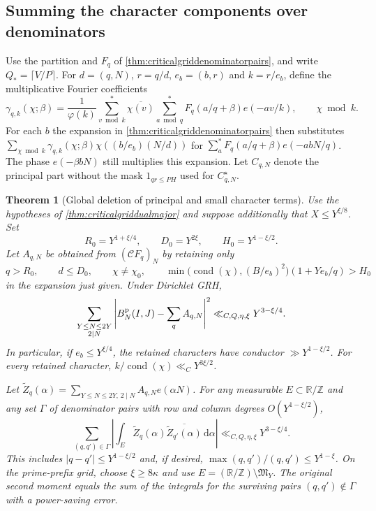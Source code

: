 \documentclass[11pt,a4paper]{article}
\numberwithin{equation}{section}
\newtheorem{theorem}{Theorem}[section]
\newcommand{\ud}{\mathrm d}
\begin{document}
\clearpage
\subsection{Summing the character components over denominators}

Use the partition and $F_q$ of
\cref{thm:criticalgriddenominatorpairs}, and write
$Q_*=\lceil V/P\rceil$. For $d=(q,N)$, $r=q/d$,
$e_b=(b,r)$ and $k=r/e_b$, define the multiplicative
Fourier coefficients
\[
 \gamma_{q,k}(\chi;\beta)=
 \frac1{\varphi(k)}
 \sum_{v\bmod k}^{*}\overline{\chi(v)}
 \sum_{a\bmod q}^{*}F_q(a/q+\beta)e(-av/k),
            \qquad \chi\bmod k.
\]
For each $b$ the expansion in \cref{thm:criticalgriddenominatorpairs}
then substitutes
$\sum_{\chi\bmod k}\gamma_{q,k}(\chi;\beta)\chi((b/e_b)(N/d))$
for $\sum_a^*F_q(a/q+\beta)e(-abN/q)$. The phase
$e(-\beta bN)$ still multiplies this expansion. Let
$C_{q,N}$ denote the principal part without the mask
$1_{qr\le PH}$ used for $C_{q,N}^{\star}$.

\begin{theorem}[Global deletion of principal and small character terms]
\label{thm:criticalgridglobalcharacters}
Use the hypotheses of \cref{thm:criticalgriddualmajor} and
suppose additionally that $X\le Y^{\xi/8}$. Set
\[
 R_0=Y^{1+\xi/4},\qquad D_0=Y^{2\xi},\qquad H_0=Y^{1-\xi/2}.
\]
Let $A_{q,N}$ be obtained from $(\mathcal C F_q)_N$ by
retaining only
\begin{equation}
 q>R_0,\qquad d\le D_0,\qquad \chi\ne\chi_0,\qquad
 \min\bigl(\operatorname{cond}(\chi),(B/e_b)^2\bigr)
                      (1+Y e_b/q)>H_0
 \label{eq:criticalgridglobalcut}
\end{equation}
in the expansion just given. Under Dirichlet GRH,
\begin{equation}
  \sum_{\substack{Y\le N\le2Y\\2\mid N}}
       \left|B_N^{\rm p}(I,J)-\sum_q A_{q,N}\right|^2
       \ll_{C,Q,\eta,\xi}Y^{3-\xi/4}.
 \label{eq:criticalgridglobalcharacters}
\end{equation}
In particular, if $e_b\le Y^{\xi/4}$, the retained
characters have conductor $\gg Y^{1-\xi/2}$.
For every retained character,
$k/\operatorname{cond}(\chi)\ll_C Y^{3\xi/2}$.

Let $\widetilde Z_q(\alpha)=\sum_{Y\le N\le 2Y,\,2\mid N}
A_{q,N}e(\alpha N)$. For any measurable $E\subset\mathbb R/\mathbb Z$
and any set $\Gamma$ of denominator pairs with row and
column degrees $O(Y^{1-\xi/2})$,
\begin{equation}
 \sum_{(q,q')\in\Gamma}\left|
     \int_E\widetilde Z_q(\alpha)
              \overline{\widetilde Z_{q'}(\alpha)}\,\ud\alpha\right|
 \ll_{C,Q,\eta,\xi}Y^{3-\xi/4}.
 \label{eq:criticalgridwidegap}
\end{equation}
This includes $|q-q'|\le Y^{1-\xi/2}$ and, if desired,
$\max(q,q')/(q,q')\le Y^{1-\xi}$.
On the prime-prefix grid, choose $\xi\ge8\kappa$
and use $E=(\mathbb R/\mathbb Z)\setminus\mathfrak M_Y$.
The original second moment equals the sum of the integrals for
the surviving pairs $(q,q')\notin\Gamma$ with a power-saving error.
\end{theorem}
\end{document}
